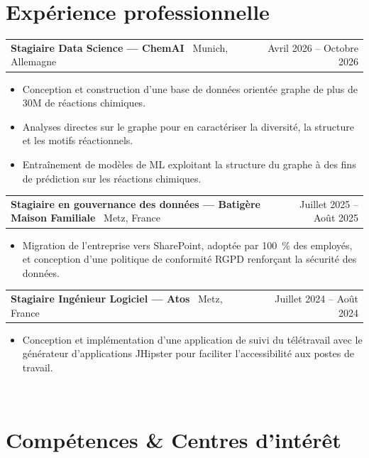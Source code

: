 \documentclass[a4paper,10pt]{article}
\makeatletter
\newenvironment{joblong}[3]
    {
    \begin{tabularx}{\linewidth}{@{}l X r@{}}
    \textbf{#1} \textbar\ #2 & \hfill &  #3
    \end{tabularx}
    \begin{minipage}[t]{\linewidth}
    \begin{itemize}[nosep,after=\strut, leftmargin=1em, itemsep=0pt,label=--]
    }
    {
    \end{itemize}
    \end{minipage}
    }
\makeatother
\begin{document}

\section{Expérience professionnelle}

\begin{joblong}{Stagiaire Data Science --- ChemAI}{Munich, Allemagne}{Avril 2026 -- Octobre 2026}
\item Conception et construction d'une base de données orientée graphe de plus de 30M de réactions chimiques.
\item Analyses directes sur le graphe pour en caractériser la diversité, la structure et les motifs réactionnels.
\item Entraînement de modèles de ML exploitant la structure du graphe à des fins de prédiction sur les réactions chimiques.
\end{joblong}\vspace{-18pt}

\begin{joblong}{Stagiaire en gouvernance des données --- Batigère Maison Familiale}{Metz, France}{Juillet 2025 -- Août 2025}
\item Migration de l'entreprise vers SharePoint, adoptée par 100~\% des employés, et conception d'une politique de conformité RGPD renforçant la sécurité des données.
\end{joblong}\vspace{-6pt}

\begin{joblong}{Stagiaire Ingénieur Logiciel --- Atos}{Metz, France}{Juillet 2024 -- Août 2024}
\item Conception et implémentation d'une application de suivi du télétravail avec le générateur d'applications JHipster pour faciliter l'accessibilité aux postes de travail.
\end{joblong} \\[-16pt]

\section{Compétences \& Centres d'intérêt}
\end{document}
